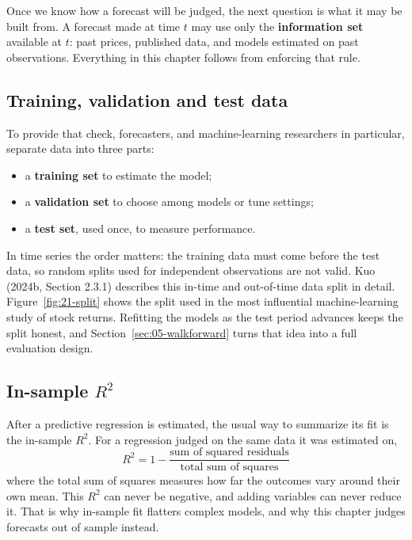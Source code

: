 Once we know how a forecast will be judged, the next question is what it may be built from. A forecast made at time $t$ may use only the \textbf{information set} available at $t$: past prices, published data, and models estimated on past observations. Everything in this chapter follows from enforcing that rule.

\subsection{Training, validation and test data}

To provide that check, forecasters, and machine-learning researchers in particular, separate data into three parts:

\begin{itemize}
  \item a \textbf{training set} to estimate the model;
  \item a \textbf{validation set} to choose among models or tune settings;
  \item a \textbf{test set}, used once, to measure performance.
\end{itemize}

In time series the order matters: the training data must come before the test data, so random splits used for independent observations are not valid. Kuo (2024b, Section 2.3.1) describes this in-time and out-of-time data split in detail. Figure~\ref{fig:21-split} shows the split used in the most influential machine-learning study of stock returns. Refitting the models as the test period advances keeps the split honest, and Section~\ref{sec:05-walkforward} turns that idea into a full evaluation design.

\subsection{In-sample \texorpdfstring{$R^2$}{R2}}

After a predictive regression is estimated, the usual way to summarize its fit is the in-sample $R^2$. For a regression judged on the same data it was estimated on,
\begin{equation}
  R^2 = 1 - \frac{\text{sum of squared residuals}}{\text{total sum of squares}}
  \label{eq:05-r2}
\end{equation}
where the total sum of squares measures how far the outcomes vary around their own mean. This $R^2$ can never be negative, and adding variables can never reduce it. That is why in-sample fit flatters complex models, and why this chapter judges forecasts out of sample instead.

